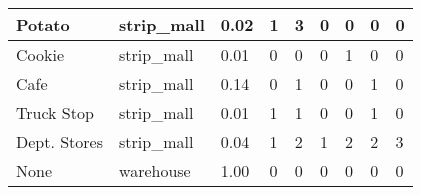 \begin{table}[]
\begin{tabular}{|l|l|l|l|l|l|l|l|l|}
    Potato                   & strip\_mall                     & 0.02                               & 1                & 3              & 0                & 0             & 0              & 0                \\ \hline
    Cookie                   & strip\_mall                     & 0.01                               & 0                & 0              & 0                & 1             & 0              & 0                \\ \hline
    Cafe                     & strip\_mall                     & 0.14                               & 0                & 1              & 0                & 0             & 1              & 0                \\ \hline
    Truck Stop               & strip\_mall                     & 0.01                               & 1                & 1              & 0                & 0             & 1              & 0                \\ \hline
    Dept. Stores             & strip\_mall                     & 0.04                               & 1                & 2              & 1                & 2             & 2              & 3                \\ \hline
    None                     & warehouse                       & 1.00                               & 0                & 0              & 0                & 0             & 0              & 0                \\ \hline
    \end{tabular}
    \end{table}